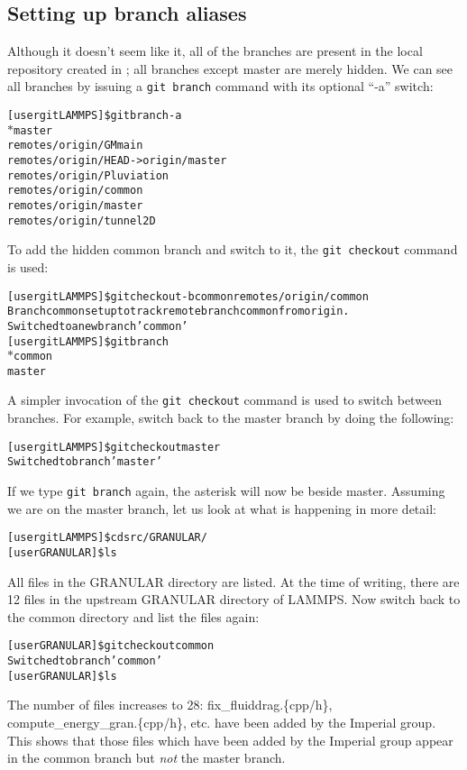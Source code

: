 \documentclass[a4paper,oneside,11pt]{article}
\begin{document}
\subsection{Setting up branch aliases}
Although it doesn't seem like it, all of the branches are present in the local repository created in ; all branches except master are merely hidden. We can see all branches by issuing a \texttt{git branch} command with its optional ``-a'' switch:
\begin{alltt}
[user gitLAMMPS]\$ git branch -a
\(\ast\) master
  remotes/origin/GMmain
  remotes/origin/HEAD -> origin/master
  remotes/origin/Pluviation
  remotes/origin/common
  remotes/origin/master
  remotes/origin/tunnel2D
\end{alltt}
To add the hidden common branch and switch to it, the \texttt{git checkout} command is used:
\begin{alltt}
[user gitLAMMPS]\$ git checkout -b common remotes/origin/common
Branch common set up to track remote branch common from origin.
Switched to a new branch 'common'
[user gitLAMMPS]\$ git branch
\(\ast\) common
  master
\end{alltt}
A simpler invocation of the \texttt{git checkout} command is used to switch between branches. For example, switch back to the master branch by doing the following:
\begin{alltt}
[user gitLAMMPS]\$ git checkout master
Switched to branch 'master'
\end{alltt}
If we type \texttt{git branch} again, the asterisk will now be beside master. Assuming we are on the master branch, let us look at what is happening in more detail:
\begin{alltt}
[user gitLAMMPS]\$ cd src/GRANULAR/
[user GRANULAR]\$ ls
\end{alltt}
All files in the GRANULAR directory are listed. At the time of writing, there are 12 files in the upstream GRANULAR directory of LAMMPS. Now switch back to the common directory and list the files again:
\begin{alltt}
[user GRANULAR]\$ git checkout common
Switched to branch 'common'
[user GRANULAR]\$ ls
\end{alltt}
The number of files increases to 28: fix\_fluiddrag.\{cpp\slash h\}, compute\_energy\_gran.\{cpp\slash h\}, etc. have been added by the Imperial group. This shows that those files which have been added by the Imperial group appear in the common branch but \emph{not} the master branch.
\end{document}
